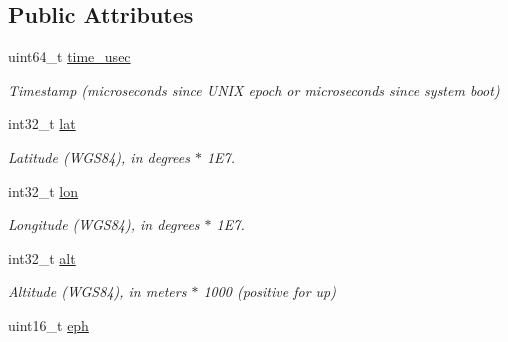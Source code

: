 \subsection*{Public Attributes}
\begin{DoxyCompactItemize}
\item 
\hypertarget{struct____mavlink__hil__gps__t_a06069c8971366092665b51a939e9abb3}{uint64\+\_\+t \hyperlink{struct____mavlink__hil__gps__t_a06069c8971366092665b51a939e9abb3}{time\+\_\+usec}}\label{struct____mavlink__hil__gps__t_a06069c8971366092665b51a939e9abb3}

\begin{DoxyCompactList}\small\item\em Timestamp (microseconds since U\+N\+I\+X epoch or microseconds since system boot) \end{DoxyCompactList}\item 
\hypertarget{struct____mavlink__hil__gps__t_a5adc957f66ccbd23fe9bfabd056c03c5}{int32\+\_\+t \hyperlink{struct____mavlink__hil__gps__t_a5adc957f66ccbd23fe9bfabd056c03c5}{lat}}\label{struct____mavlink__hil__gps__t_a5adc957f66ccbd23fe9bfabd056c03c5}

\begin{DoxyCompactList}\small\item\em Latitude (W\+G\+S84), in degrees $\ast$ 1\+E7. \end{DoxyCompactList}\item 
\hypertarget{struct____mavlink__hil__gps__t_abfec6d143d48f5b7e5e37cd8c98d6f82}{int32\+\_\+t \hyperlink{struct____mavlink__hil__gps__t_abfec6d143d48f5b7e5e37cd8c98d6f82}{lon}}\label{struct____mavlink__hil__gps__t_abfec6d143d48f5b7e5e37cd8c98d6f82}

\begin{DoxyCompactList}\small\item\em Longitude (W\+G\+S84), in degrees $\ast$ 1\+E7. \end{DoxyCompactList}\item 
\hypertarget{struct____mavlink__hil__gps__t_a9d9f5ccc1ded23c02b7a7ed760c66a73}{int32\+\_\+t \hyperlink{struct____mavlink__hil__gps__t_a9d9f5ccc1ded23c02b7a7ed760c66a73}{alt}}\label{struct____mavlink__hil__gps__t_a9d9f5ccc1ded23c02b7a7ed760c66a73}

\begin{DoxyCompactList}\small\item\em Altitude (W\+G\+S84), in meters $\ast$ 1000 (positive for up) \end{DoxyCompactList}\item 
\hypertarget{struct____mavlink__hil__gps__t_a1886825c99c4312c1c5f5e2e42c8ebc2}{uint16\+\_\+t \hyperlink{struct____mavlink__hil__gps__t_a1886825c99c4312c1c5f5e2e42c8ebc2}{eph}}\label{struct____mavlink__hil__gps__t_a1886825c99c4312c1c5f5e2e42c8ebc2}


\end{DoxyCompactItemize}

